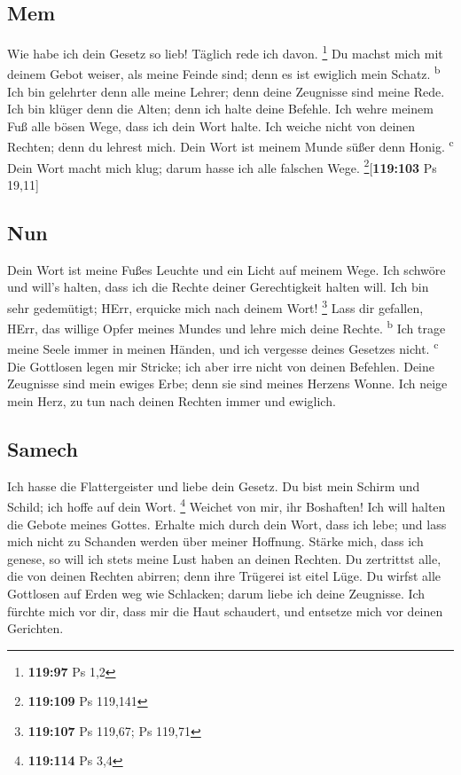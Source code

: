 \hypertarget{mem}{%
\subsection{Mem}\label{mem}}

 Wie habe ich dein Gesetz so lieb! Täglich rede ich
davon. \footnote{\textbf{119:97} Ps 1,2}  Du machst mich
mit deinem Gebot weiser, als meine Feinde sind; denn es ist ewiglich
mein Schatz. \textsuperscript{b}  Ich bin gelehrter denn
alle meine Lehrer; denn deine Zeugnisse sind meine Rede.
 Ich bin klüger denn die Alten; denn ich halte deine
Befehle.  Ich wehre meinem Fuß alle bösen Wege, dass ich
dein Wort halte.  Ich weiche nicht von deinen Rechten;
denn du lehrest mich.  Dein Wort ist meinem Munde süßer
denn Honig. \textsuperscript{c}  Dein Wort macht mich
klug; darum hasse ich alle falschen Wege. \footnote{\textbf{119:109} Ps
  119,141}{[}\textbf{119:103} Ps 19,11{]}

\hypertarget{nun}{%
\subsection{Nun}\label{nun}}

 Dein Wort ist meine Fußes Leuchte und ein Licht auf
meinem Wege.  Ich schwöre und will's halten, dass ich
die Rechte deiner Gerechtigkeit halten will.  Ich bin
sehr gedemütigt; HErr, erquicke mich nach deinem Wort! \footnote{\textbf{119:107}
  Ps 119,67; Ps 119,71}  Lass dir gefallen, HErr, das
willige Opfer meines Mundes und lehre mich deine Rechte.
\textsuperscript{b}  Ich trage meine Seele immer in
meinen Händen, und ich vergesse deines Gesetzes nicht.
\textsuperscript{c}  Die Gottlosen legen mir Stricke;
ich aber irre nicht von deinen Befehlen.  Deine
Zeugnisse sind mein ewiges Erbe; denn sie sind meines Herzens Wonne.
 Ich neige mein Herz, zu tun nach deinen Rechten immer
und ewiglich.

\hypertarget{samech}{%
\subsection{Samech}\label{samech}}

 Ich hasse die Flattergeister und liebe dein Gesetz.
 Du bist mein Schirm und Schild; ich hoffe auf dein
Wort. \footnote{\textbf{119:114} Ps 3,4}  Weichet von
mir, ihr Boshaften! Ich will halten die Gebote meines Gottes.
 Erhalte mich durch dein Wort, dass ich lebe; und lass
mich nicht zu Schanden werden über meiner Hoffnung. 
Stärke mich, dass ich genese, so will ich stets meine Lust haben an
deinen Rechten.  Du zertrittst alle, die von deinen
Rechten abirren; denn ihre Trügerei ist eitel Lüge.  Du
wirfst alle Gottlosen auf Erden weg wie Schlacken; darum liebe ich deine
Zeugnisse.  Ich fürchte mich vor dir, dass mir die Haut
schaudert, und entsetze mich vor deinen Gerichten.

